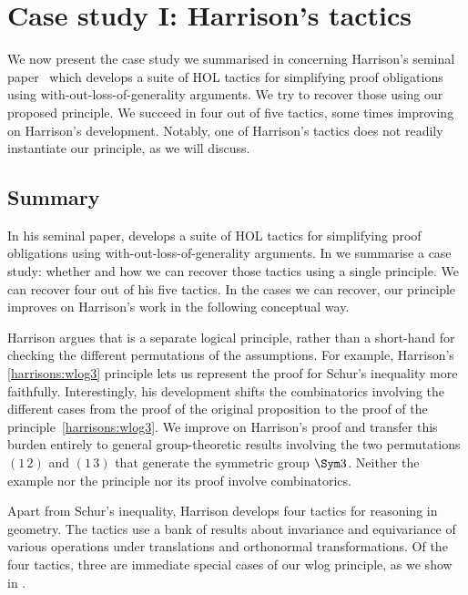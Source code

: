 \section{Case study I: Harrison's tactics}
We now present the case study we summarised in  concerning Harrison's seminal
paper~\cite{DBLP:conf/tphol/Harrison09} which develops a suite of HOL
tactics for simplifying proof obligations using
with-out-loss-of-generality arguments. We try to recover those using our
proposed \WLOG{} principle. We succeed in four out of five tactics, some
times improving on Harrison's development. Notably, one of Harrison's
tactics does not readily instantiate our \WLOG{} principle, as we will
discuss.

\subsection{Summary}

In his seminal paper, \citet{DBLP:conf/tphol/Harrison09} develops a
suite of HOL tactics for simplifying proof obligations using
with-out-loss-of-generality arguments. In 
we summarise a case study: whether and how we can recover those tactics using
a single \WLOG{} principle. We can recover four out of his five
\WLOG{} tactics. In the cases we can recover, our \WLOG{} principle
improves on Harrison's work in the following conceptual way.

Harrison argues that \WLOG{} is a separate logical principle, rather than
a short-hand for checking the different permutations of the assumptions.
For example, Harrison's \eqref{harrisons:wlog3} principle lets us
represent the proof for Schur's inequality more faithfully. Interestingly,
his development shifts the combinatorics involving the different cases
from the proof of the original proposition to the proof
of the principle~\eqref{harrisons:wlog3}. We improve on Harrison's proof and
transfer this burden entirely to general group-theoretic results involving
the two permutations $(1\,2)$ and $(1\,3)$ that generate
the symmetric group $\Sym 3$. Neither the example nor the principle nor its proof
involve combinatorics.

Apart from Schur's inequality, Harrison develops four tactics for
\WLOG{} reasoning in geometry. The tactics use a bank of results about
invariance and equivariance of various operations under
translations and orthonormal transformations.
Of the four tactics, three are immediate special cases of our wlog
principle, as we show in .


